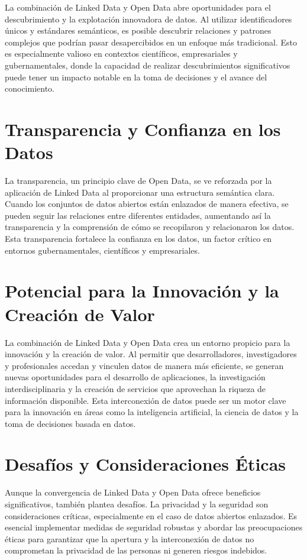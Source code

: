 \documentclass[11pt]{report}
\begin{document}
		La combinación de Linked Data y Open Data abre oportunidades para el descubrimiento y la explotación innovadora de datos. Al utilizar identificadores únicos y estándares semánticos, es posible descubrir relaciones y patrones complejos que podrían pasar desapercibidos en un enfoque más tradicional. Esto es especialmente valioso en contextos científicos, empresariales y gubernamentales, donde la capacidad de realizar descubrimientos significativos puede tener un impacto notable en la toma de decisiones y el avance del conocimiento.
		
		\section{Transparencia y Confianza en los Datos}
		
		La transparencia, un principio clave de Open Data, se ve reforzada por la aplicación de Linked Data al proporcionar una estructura semántica clara. Cuando los conjuntos de datos abiertos están enlazados de manera efectiva, se pueden seguir las relaciones entre diferentes entidades, aumentando así la transparencia y la comprensión de cómo se recopilaron y relacionaron los datos. Esta transparencia fortalece la confianza en los datos, un factor crítico en entornos gubernamentales, científicos y empresariales.
		
		\section{Potencial para la Innovación y la Creación de Valor}
		
		La combinación de Linked Data y Open Data crea un entorno propicio para la innovación y la creación de valor. Al permitir que desarrolladores, investigadores y profesionales accedan y vinculen datos de manera más eficiente, se generan nuevas oportunidades para el desarrollo de aplicaciones, la investigación interdisciplinaria y la creación de servicios que aprovechan la riqueza de información disponible. Esta interconexión de datos puede ser un motor clave para la innovación en áreas como la inteligencia artificial, la ciencia de datos y la toma de decisiones basada en datos.
		
		\section{Desafíos y Consideraciones Éticas}
		
		Aunque la convergencia de Linked Data y Open Data ofrece beneficios significativos, también plantea desafíos. La privacidad y la seguridad son consideraciones críticas, especialmente en el caso de datos abiertos enlazados. Es esencial implementar medidas de seguridad robustas y abordar las preocupaciones éticas para garantizar que la apertura y la interconexión de datos no comprometan la privacidad de las personas ni generen riesgos indebidos.
\end{document}
